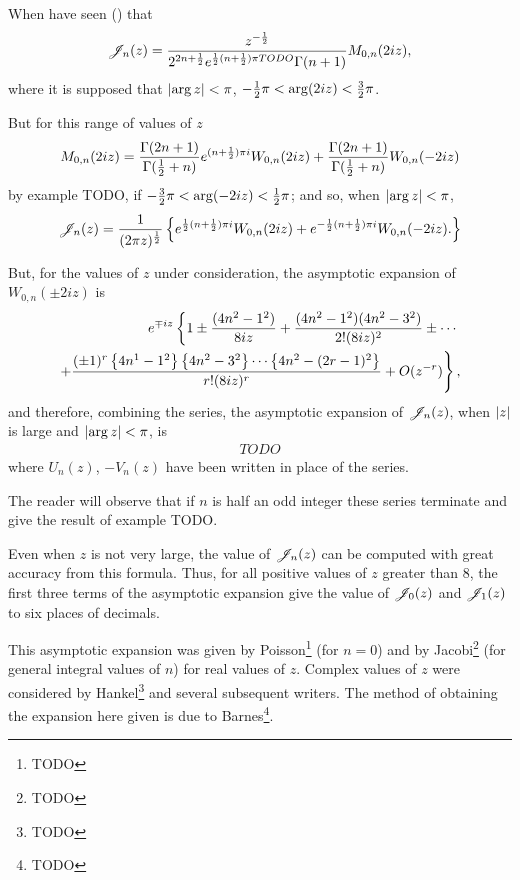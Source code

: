 When have seen () that
$$
\mathscr{J}_{n}(z)
=
\frac{z^{-\frac{1}{2}}}{2^{2n+\frac{1}{2}} e^{\frac{1}{2}(n+\frac{1}{2})\pi TODO} \Gamma(n+1)}
M_{0,n}(2iz),
$$
where it is supposed that
$\left|  \arg z  \right| < \pi$,
$-\frac{1}{2}\pi < \arg (2iz) < \frac{3}{2} \pi$.

But for this range of values of $z$
$$
M_{0,n}(2iz)
=
\frac{\Gamma(2n+1)}{\Gamma(\frac{1}{2} + n)}
e^{(n+\frac{1}{2})\pi i}
W_{0,n}(2iz)
+
\frac{\Gamma(2n+1)}{\Gamma(\frac{1}{2}+n)}
W_{0,n}(-2iz)
$$
by  example TODO,
if
$-\frac{3}{2} \pi < \arg (-2iz) < \frac{1}{2} \pi$; and so, when
$\left| \arg z \right| < \pi$,
$$
\mathscr{J}_{n}(z)
=
\frac{1}{(2\pi z)^{\frac{1}{2}}}
\left\{ 
  e^{\frac{1}{2} (n+\frac{1}{2})\pi i} W_{0,n}(2iz)
  +
  e^{-\frac{1}{2} (n+\frac{1}{2})\pi i} W_{0,n}(-2iz).
 \right\}
$$

But, for the values of $z$ under consideration, the asymptotic
expansion of $W_{0,n}(\pm 2 i z)$ is
\begin{align*}
  e^{\mp i z}
  \left\{
    1
    \pm \frac{(4n^{2} - 1^{2})}{8iz}
    + \frac{ (4n^{2}-1^{2})(4n^{2}-3^{2})}{2! (8iz)^{2}}
    \pm \cdots
  \right.
  \\
  \left.
    + \frac{ (\pm 1)^{r} \left\{ 4n^{1}-1^{2} \right\} \left\{ 4n^{2}-3^{2} \right\} \cdots
      \left\{ 4n^{2} - (2r-1)^{2} \right\}  }{r! (8iz)^{r}}
    + O(z^{-r})
  \right\},
\end{align*}
and therefore, combining the series, the asymptotic expansion of
$\mathscr{J}_{n}(z)$, when $\left| z \right|$ is large and $\left| \arg z \right| < \pi$, is
\begin{align*}
  TODO
\end{align*}
where $U_{n}(z)$, $-V_{n}(z)$ have been written in place of the series.

The reader will observe that if $n$ is half an odd integer these
series terminate and give the result of 
example TODO.

%
%
Even when $z$ is not very large, the value of $\mathscr{J}_{n}(z)$ can be
computed with great accuracy from this formula. Thus, for all
positive values of $z$ greater than $8$, the first three terms of
the asymptotic expansion give the value of $\mathscr{J}_{0}(z)$ and $\mathscr{J}_{1}(z)$ to
six places of decimals.

This asymptotic expansion was given by Poisson\footnote{TODO} (for
$n=0$) and by Jacobi\footnote{TODO} (for general integral values of
$n$) for real values of $z$.
Complex values of $z$ were considered by Hankel\footnote{TODO} and
several subsequent writers. The method of obtaining the expansion
here given is due to Barnes\footnote{TODO}.

